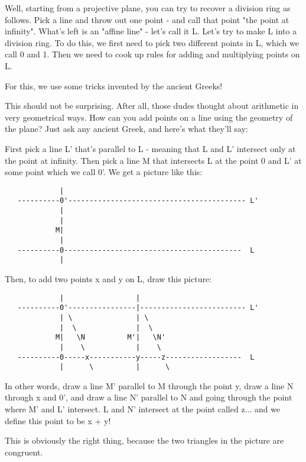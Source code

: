 Well, starting from a projective plane, you can try to recover a
division ring as follows.  Pick a line and throw out one point - and
call that point "the point at infinity".  What's left is an 
"affine
line" - let's call it L.  Let's try to make L into a division ring.  To
do this, we first need to pick two different points in L, which we call
0 and 1.  Then we need to cook up rules for adding and multiplying
points on L.  

For this, we use some tricks invented by the ancient Greeks!   

This should not be surprising.  After all, those dudes thought about
arithmetic in very geometrical ways.   How can you add points on a line
using the geometry of the plane?  Just ask any ancient Greek, and here's
what they'll say:

First pick a line L' that's parallel to L - meaning that L and L'
intersect only at the point at infinity.  Then pick a line M that
intersects L at the point 0 and L' at some point which we call 0'.  
We get a picture like this:

\begin{verbatim}
             |             
   ----------0'------------------------------------------ L'
             |             
             |             
            M|             
             |             
   ----------0------------------------------------------  L
             |             
\end{verbatim}
    
Then, to add two points x and y on L, draw this picture:


\begin{verbatim}
             |                 |
   ----------0'----------------|------------------------- L'
             | \               | \
             |  \              |  \
            M|   \N          M'|   \N'
             |    \            |    \
   ----------0-----x-----------y-----z------------------  L
             |      \          |      \
\end{verbatim}
    
In other words, draw a line M' parallel to M through the point y,
draw a line N through x and 0', and draw a line N' parallel to N and
going through the point where M' and L' intersect.  L and N' intersect
at the point called z... and we define this point to be x + y!   

This is obviously the right thing, because the two triangles in the
picture are congruent.


